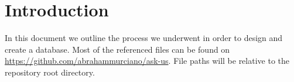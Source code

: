 \section*{Introduction}

In this document we outline the process we underwent in order to design and create a database. Most of the referenced files can be found on \url{https://github.com/abrahammurciano/ask-us}. File paths will be relative to the repository root directory.